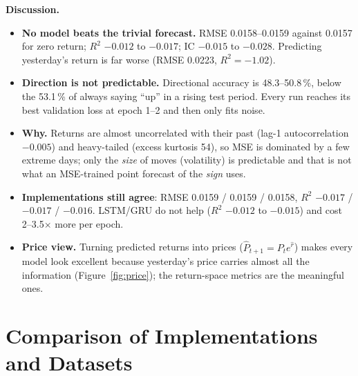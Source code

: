 \documentclass[11pt, a4paper]{article}
\begin{document}
\textbf{Discussion.}
\begin{itemize}
\item \textbf{No model beats the trivial forecast.} RMSE 0.0158--0.0159 against 0.0157 for zero return; $R^2$ $-0.012$ to $-0.017$; IC $-0.015$ to $-0.028$. Predicting yesterday's return is far worse (RMSE 0.0223, $R^2=-1.02$).
\item \textbf{Direction is not predictable.} Directional accuracy is 48.3--50.8\,\%, below the 53.1\,\% of always saying ``up'' in a rising test period.
  Every run reaches its best validation loss at epoch 1--2 and then only fits noise.
\item \textbf{Why.} Returns are almost uncorrelated with their past (lag-1 autocorrelation $-0.005$) and heavy-tailed (excess kurtosis 54), so MSE is dominated by a few extreme days; only the \emph{size} of moves (volatility) is predictable and that is not what an MSE-trained point forecast of the \emph{sign} uses.
\item \textbf{Implementations still agree}: RMSE 0.0159 / 0.0159 / 0.0158, $R^2$ $-0.017$ / $-0.017$ / $-0.016$. LSTM/GRU do not help ($R^2$ $-0.012$ to $-0.015$) and cost 2--3.5$\times$ more per epoch.
\item \textbf{Price view.} Turning predicted returns into prices ($\hat P_{t+1}=P_te^{\hat r}$) makes every model look excellent because yesterday's price carries almost all the information (Figure~\ref{fig:price}); the return-space metrics are the meaningful ones.
\end{itemize}

\section{Comparison of Implementations and Datasets}
\end{document}
